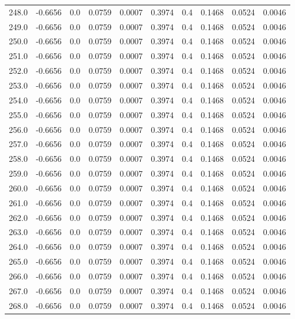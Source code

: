 \begin{longtable}{lrrrrrrrrr}
248.0 & -0.6656 & 0.0 & 0.0759 & 0.0007 & 0.3974 & 0.4 & 0.1468 & 0.0524 & 0.0046 \\
249.0 & -0.6656 & 0.0 & 0.0759 & 0.0007 & 0.3974 & 0.4 & 0.1468 & 0.0524 & 0.0046 \\
250.0 & -0.6656 & 0.0 & 0.0759 & 0.0007 & 0.3974 & 0.4 & 0.1468 & 0.0524 & 0.0046 \\
251.0 & -0.6656 & 0.0 & 0.0759 & 0.0007 & 0.3974 & 0.4 & 0.1468 & 0.0524 & 0.0046 \\
252.0 & -0.6656 & 0.0 & 0.0759 & 0.0007 & 0.3974 & 0.4 & 0.1468 & 0.0524 & 0.0046 \\
253.0 & -0.6656 & 0.0 & 0.0759 & 0.0007 & 0.3974 & 0.4 & 0.1468 & 0.0524 & 0.0046 \\
254.0 & -0.6656 & 0.0 & 0.0759 & 0.0007 & 0.3974 & 0.4 & 0.1468 & 0.0524 & 0.0046 \\
255.0 & -0.6656 & 0.0 & 0.0759 & 0.0007 & 0.3974 & 0.4 & 0.1468 & 0.0524 & 0.0046 \\
256.0 & -0.6656 & 0.0 & 0.0759 & 0.0007 & 0.3974 & 0.4 & 0.1468 & 0.0524 & 0.0046 \\
257.0 & -0.6656 & 0.0 & 0.0759 & 0.0007 & 0.3974 & 0.4 & 0.1468 & 0.0524 & 0.0046 \\
258.0 & -0.6656 & 0.0 & 0.0759 & 0.0007 & 0.3974 & 0.4 & 0.1468 & 0.0524 & 0.0046 \\
259.0 & -0.6656 & 0.0 & 0.0759 & 0.0007 & 0.3974 & 0.4 & 0.1468 & 0.0524 & 0.0046 \\
260.0 & -0.6656 & 0.0 & 0.0759 & 0.0007 & 0.3974 & 0.4 & 0.1468 & 0.0524 & 0.0046 \\
261.0 & -0.6656 & 0.0 & 0.0759 & 0.0007 & 0.3974 & 0.4 & 0.1468 & 0.0524 & 0.0046 \\
262.0 & -0.6656 & 0.0 & 0.0759 & 0.0007 & 0.3974 & 0.4 & 0.1468 & 0.0524 & 0.0046 \\
263.0 & -0.6656 & 0.0 & 0.0759 & 0.0007 & 0.3974 & 0.4 & 0.1468 & 0.0524 & 0.0046 \\
264.0 & -0.6656 & 0.0 & 0.0759 & 0.0007 & 0.3974 & 0.4 & 0.1468 & 0.0524 & 0.0046 \\
265.0 & -0.6656 & 0.0 & 0.0759 & 0.0007 & 0.3974 & 0.4 & 0.1468 & 0.0524 & 0.0046 \\
266.0 & -0.6656 & 0.0 & 0.0759 & 0.0007 & 0.3974 & 0.4 & 0.1468 & 0.0524 & 0.0046 \\
267.0 & -0.6656 & 0.0 & 0.0759 & 0.0007 & 0.3974 & 0.4 & 0.1468 & 0.0524 & 0.0046 \\
268.0 & -0.6656 & 0.0 & 0.0759 & 0.0007 & 0.3974 & 0.4 & 0.1468 & 0.0524 & 0.0046 \\

\end{longtable}
